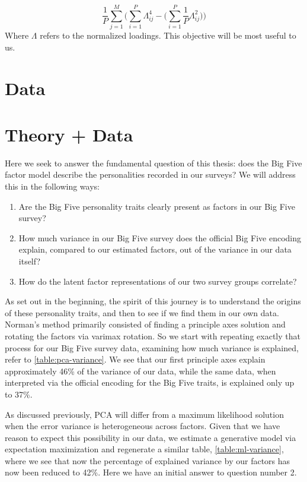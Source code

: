 \documentclass[a4paper,12pt]{article}
\begin{document}
\begin{equation}
\frac{1}{P} \sum_{j=1}^M \bigg( \sum_{i=1}^P\Lambda_{ij}^4 - \bigg( \sum_{i=1}^P\frac{1}{P}\Lambda_{ij}^2\bigg)\bigg)
\end{equation}
%
Where $\Lambda$ refers to the normalized loadings. This objective will be most useful to us.

\section{Data}

\section{Theory + Data}

Here we seek to answer the fundamental question of this thesis: does the Big Five factor model describe the personalities recorded in our surveys? We will address this in the following ways:

\begin{enumerate}

\item Are the Big Five personality traits clearly present as factors in our Big Five survey?

\item How much variance in our Big Five survey does the official Big Five encoding explain, compared to our estimated factors, out of the variance in our data itself?

\item How do the latent factor representations of our two survey groups correlate?
\end{enumerate}

As set out in the beginning, the spirit of this journey is to understand the origins of these personality traits, and then to see if we find them in our own data. Norman's method primarily consisted of finding a principle axes solution and rotating the factors via varimax rotation. So we start with repeating exactly that process for our Big Five survey data, examining how much variance is explained, refer to \ref{table:pca-variance}. We see that our first principle axes explain approximately 46\% of the variance of our data, while the same data, when interpreted via the official encoding for the Big Five traits, is explained only up to 37\%.

As discussed previously, PCA will differ from a maximum likelihood solution when the error variance is heterogeneous across factors. Given that we have reason to expect this possibility in our data, we estimate a generative model via expectation maximization and regenerate a similar table, \ref{table:ml-variance}, where we see that now the percentage of explained variance by our factors has now been reduced to 42\%. Here we have an initial answer to question number 2.
\end{document}
